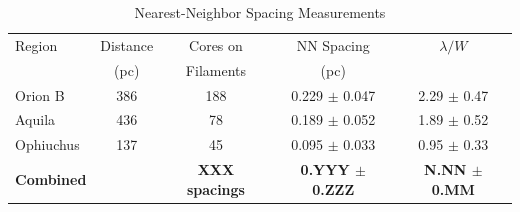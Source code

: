 
\begin{table}
\caption{Nearest-Neighbor Spacing Measurements}
\label{tab:nn_spacing}
\begin{tabular}{lcccc}
\toprule
Region & Distance & Cores on & NN Spacing & $\lambda/W$ \\
       & (pc)   & Filaments & (pc)      &  \\
\midrule

Orion B   & 386 & 188 & 0.229 $\pm$ 0.047 & 2.29 $\pm$ 0.47 \\
Aquila    & 436 & 78  & 0.189 $\pm$ 0.052 & 1.89 $\pm$ 0.52 \\
Ophiuchus & 137 & 45  & 0.095 $\pm$ 0.033 & 0.95 $\pm$ 0.33 \\
\midrule
\textbf{Combined} &  & \textbf{XXX spacings} & \textbf{0.YYY $\pm$ 0.ZZZ} & \textbf{N.NN $\pm$ 0.MM} \\
\bottomrule
\end{tabular}
\end{table}

